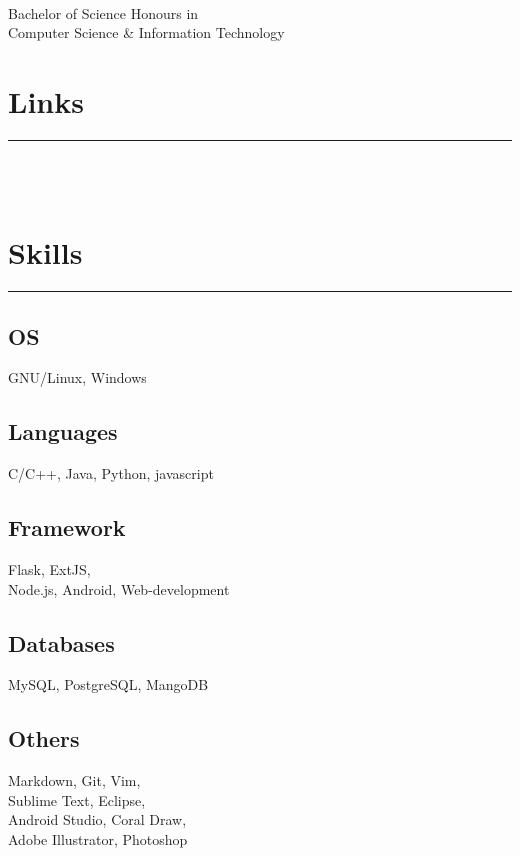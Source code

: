 \documentclass[]{neilfoxcroft-resume}
\begin{document}
%
%

\begin{minipage}[t]{0.33\textwidth} 
\begin{large}
	\\
\end{large}
Bachelor of Science Honours in \\
Computer Science \& Information Technology\\
\section{Links} 
\noindent\rule{5cm}{0.4pt}

\href{https://github.com/FoxcroftN}{\faGithub} \\
\href{https://www.linkedin.com/in/neilfoxcroft/}{\faLinkedin} \\
\href{http://neilfoxcroft.com/}{} 
\section{Skills}
\noindent\rule{5cm}{0.4pt}
\subsection{OS}
GNU/Linux, Windows
\vspace{6pt}
\subsection{Languages}
C/C++, Java, Python, javascript
\vspace{6pt}
\subsection{Framework}
Flask, ExtJS, \\Node.js, Android,
Web-development
\vspace{6pt}
\subsection{Databases}
MySQL, PostgreSQL, MangoDB
\vspace{6pt}
\subsection{Others}
Markdown, Git, Vim, \\Sublime Text, Eclipse,\\
Android Studio, Coral Draw,\\
Adobe Illustrator, Photoshop
\sectionsep

\end{minipage}
\end{document}
